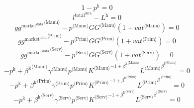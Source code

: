\begin{equation}
1 - p^{\mathrm{k}} = 0
\end{equation}
\begin{equation}
l^{\mathrm{total}^{\mathrm{data}}} - L^{\mathrm{h}} = 0
\end{equation}
\begin{equation}
{{g\!g}^{\mathrm{market}^{\mathrm{data}}}}^{\langle \mathrm{\mathrm{Manu}}\rangle} - {{p}^{\langle \mathrm{Manu}\rangle}} {{{G\!G}}^{\langle \mathrm{Manu}\rangle}} \left(1 + {{v\!a\!t}}^{\langle \mathrm{\mathrm{Manu}}\rangle}\right) = 0
\end{equation}
\begin{equation}
{{g\!g}^{\mathrm{market}^{\mathrm{data}}}}^{\langle \mathrm{\mathrm{Prim}}\rangle} - {{p}^{\langle \mathrm{Prim}\rangle}} {{{G\!G}}^{\langle \mathrm{Prim}\rangle}} \left(1 + {{v\!a\!t}}^{\langle \mathrm{\mathrm{Prim}}\rangle}\right) = 0
\end{equation}
\begin{equation}
{{g\!g}^{\mathrm{market}^{\mathrm{data}}}}^{\langle \mathrm{\mathrm{Serv}}\rangle} - {{p}^{\langle \mathrm{Serv}\rangle}} {{{G\!G}}^{\langle \mathrm{Serv}\rangle}} \left(1 + {{v\!a\!t}}^{\langle \mathrm{\mathrm{Serv}}\rangle}\right) = 0
\end{equation}
\begin{equation}
-p^{\mathrm{k}} + {{\beta^{\mathrm{k}}}^{\langle \mathrm{\mathrm{Manu}}\rangle}} {{\gamma}^{\langle \mathrm{\mathrm{Manu}}\rangle}} {{p}^{\langle \mathrm{Manu}\rangle}} {{{K}^{\langle \mathrm{Manu}\rangle}}^{-1 + {\beta^{\mathrm{k}}}^{\langle \mathrm{\mathrm{Manu}}\rangle}}} {{{L}^{\langle \mathrm{Manu}\rangle}}^{{\beta^{\mathrm{l}}}^{\langle \mathrm{\mathrm{Manu}}\rangle}}} = 0
\end{equation}
\begin{equation}
-p^{\mathrm{k}} + {{\beta^{\mathrm{k}}}^{\langle \mathrm{\mathrm{Prim}}\rangle}} {{\gamma}^{\langle \mathrm{\mathrm{Prim}}\rangle}} {{p}^{\langle \mathrm{Prim}\rangle}} {{{K}^{\langle \mathrm{Prim}\rangle}}^{-1 + {\beta^{\mathrm{k}}}^{\langle \mathrm{\mathrm{Prim}}\rangle}}} {{{L}^{\langle \mathrm{Prim}\rangle}}^{{\beta^{\mathrm{l}}}^{\langle \mathrm{\mathrm{Prim}}\rangle}}} = 0
\end{equation}
\begin{equation}
-p^{\mathrm{k}} + {{\beta^{\mathrm{k}}}^{\langle \mathrm{\mathrm{Serv}}\rangle}} {{\gamma}^{\langle \mathrm{\mathrm{Serv}}\rangle}} {{p}^{\langle \mathrm{Serv}\rangle}} {{{K}^{\langle \mathrm{Serv}\rangle}}^{-1 + {\beta^{\mathrm{k}}}^{\langle \mathrm{\mathrm{Serv}}\rangle}}} {{{L}^{\langle \mathrm{Serv}\rangle}}^{{\beta^{\mathrm{l}}}^{\langle \mathrm{\mathrm{Serv}}\rangle}}} = 0
\end{equation}
